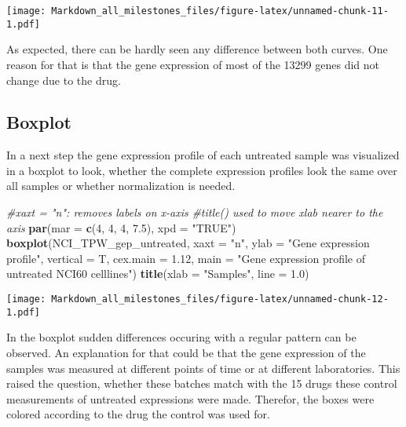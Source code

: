 \documentclass[]{article}
\newenvironment{Shaded}{\begin{snugshade}}{\end{snugshade}}
\newcommand{\CommentTok}[1]{\textcolor[rgb]{0.56,0.35,0.01}{\textit{#1}}}
\newcommand{\DataTypeTok}[1]{\textcolor[rgb]{0.13,0.29,0.53}{#1}}
\newcommand{\DecValTok}[1]{\textcolor[rgb]{0.00,0.00,0.81}{#1}}
\newcommand{\FloatTok}[1]{\textcolor[rgb]{0.00,0.00,0.81}{#1}}
\newcommand{\KeywordTok}[1]{\textcolor[rgb]{0.13,0.29,0.53}{\textbf{#1}}}
\newcommand{\NormalTok}[1]{#1}
\newcommand{\StringTok}[1]{\textcolor[rgb]{0.31,0.60,0.02}{#1}}
\begin{document}
\texttt{[image: Markdown\_all\_milestones\_files/figure-latex/unnamed-chunk-11-1.pdf]}

As expected, there can be hardly seen any difference between both
curves. One reason for that is that the gene expression of most of the
13299 genes did not change due to the drug.

\hypertarget{boxplot}{%
\subsection{Boxplot}\label{boxplot}}

In a next step the gene expression profile of each untreated sample was
visualized in a boxplot to look, whether the complete expression
profiles look the same over all samples or whether normalization is
needed.

\begin{Shaded}
\begin{Highlighting}[]
\CommentTok{#xaxt = "n": removes labels on x-axis}
\CommentTok{#title() used to move xlab nearer to the axis}
\KeywordTok{par}\NormalTok{(}\DataTypeTok{mar =} \KeywordTok{c}\NormalTok{(}\DecValTok{4}\NormalTok{, }\DecValTok{4}\NormalTok{, }\DecValTok{4}\NormalTok{, }\FloatTok{7.5}\NormalTok{), }\DataTypeTok{xpd =} \StringTok{"TRUE"}\NormalTok{)}
\KeywordTok{boxplot}\NormalTok{(NCI_TPW_gep_untreated, }
        \DataTypeTok{xaxt =} \StringTok{"n"}\NormalTok{, }
        \DataTypeTok{ylab =} \StringTok{"Gene expression profile"}\NormalTok{, }
        \DataTypeTok{vertical =}\NormalTok{  T, }
        \DataTypeTok{cex.main =} \FloatTok{1.12}\NormalTok{,}
        \DataTypeTok{main =} \StringTok{"Gene expression profile of untreated NCI60 celllines"}\NormalTok{)}
\KeywordTok{title}\NormalTok{(}\DataTypeTok{xlab =} \StringTok{"Samples"}\NormalTok{, }\DataTypeTok{line =} \FloatTok{1.0}\NormalTok{)}
\end{Highlighting}
\end{Shaded}

\texttt{[image: Markdown\_all\_milestones\_files/figure-latex/unnamed-chunk-12-1.pdf]}

In the boxplot sudden differences occuring with a regular pattern can be
observed. An explanation for that could be that the gene expression of
the samples was measured at different points of time or at different
laboratories. This raised the question, whether these batches match with
the 15 drugs these control measurements of untreated expressions were
made. Therefor, the boxes were colored according to the drug the control
was used for.
\end{document}
